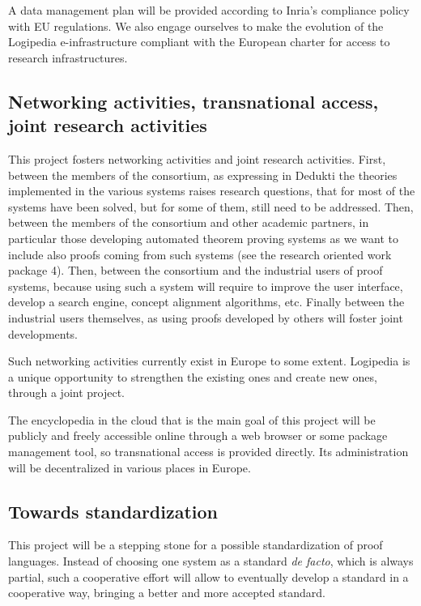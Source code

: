 A data management plan will be provided according to Inria’s
compliance policy with EU regulations. We also engage ourselves to
make the evolution of the {\textsf Logipedia} e-infrastructure compliant
with the European charter for access to research infrastructures.

\subsection{Networking activities, transnational access, joint
  research activities}

This project fosters networking activities and joint research
activities. First, between the members of the consortium, as
expressing in {\textsf Dedukti} the theories implemented in the various
systems raises research questions, that for most of the systems have
been solved, but for some of them, still need to be addressed.  Then,
between the members of the consortium and other academic partners, in
particular those developing automated theorem proving systems as we
want to include also proofs coming from such systems (see the research
oriented work package 4). Then, between the consortium and the
industrial users of proof systems, because using such a system will
require to improve the user interface, develop a search engine,
concept alignment algorithms, etc.  Finally between the industrial
users themselves, as using proofs developed by others will foster joint
developments.

Such networking activities currently exist in Europe to some extent. {\textsf
  Logipedia} is a unique opportunity to strengthen the existing ones and create new ones, through a
joint project.

The encyclopedia in the cloud that is the main goal of this project
will be publicly and freely accessible online through a web browser or some package management tool, so transnational
access is provided directly. Its administration will be decentralized
in various places in Europe.

\subsection{Towards standardization}
This project will be a stepping stone for a possible standardization
of proof languages. Instead of choosing one system as a standard {\em
de facto}, which is always partial, such a cooperative effort will
allow to eventually develop a standard in a cooperative way, bringing
a better and more accepted standard.

